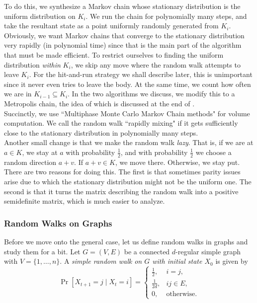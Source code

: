 To do this, we synthesize a Markov chain whose stationary distribution is the uniform distribution on $K_i$. We run the chain for polynomially many steps, and take the resultant state as a point uniformly randomly generated from $K_i$.\\

Obviously, we want Markov chains that converge to the stationary distribution very rapidly (in polynomial time) since that is the main part of the algorithm that must be made efficient. To restrict ourselves to finding the uniform distribution \textit{within} $K_i$, we skip any move where the random walk attempts to leave $K_i$. For the hit-and-run strategy we shall describe later, this is unimportant since it never even tries to leave the body. At the same time, we count how often we are in $K_{i-1}\subseteq K_i$. In the two algorithms we discuss, we modify this to a Metropolis chain, the idea of which is discussed at the end of .\\

Succinctly, we use ``Multiphase Monte Carlo Markov Chain methods" for volume computation. We call the random walk ``rapidly mixing" if it gets sufficiently close to the stationary distribution in polynomially many steps.\\

Another small change is that we make the random walk \textit{lazy}. That is, if we are at $a\in K$,  we stay at $a$ with probability $\frac{1}{2}$, and with probability $\frac{1}{2}$ we choose a random direction $a+v$. If $a+v\in K$, we move there. Otherwise, we stay put. There are two reasons for doing this. The first is that sometimes parity issues arise due to which the stationary distribution might not be the uniform one. The second is that it turns the matrix describing the random walk into a positive semidefinite matrix, which is much easier to analyze.

\subsubsection{Random Walks on Graphs}

Before we move onto the general case, let us define random walks in graphs and study them for a bit. Let $G=(V,E)$ be a connected $d$-regular simple graph with $V=\{1,\ldots,n\}$. A \textit{simple random walk on $G$ with initial state $X_0$} is given by
\[
\Pr[X_{t+1}=j\mid X_t=i] = 
\begin{cases}
\frac{1}{2}, & i=j, \\
\frac{1}{2d}, & ij\in E, \\
0, & \text{otherwise.}
\end{cases}
\]

